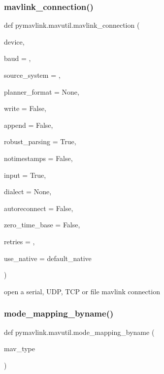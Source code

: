 \subsubsection{\texorpdfstring{mavlink\+\_\+connection()}{mavlink\_connection()}}
{\footnotesize\ttfamily def pymavlink.\+mavutil.\+mavlink\+\_\+connection (\begin{DoxyParamCaption}\item[{}]{device,  }\item[{}]{baud = {},  }\item[{}]{source\+\_\+system = {},  }\item[{}]{planner\+\_\+format = {\ttfamily None},  }\item[{}]{write = {\ttfamily False},  }\item[{}]{append = {\ttfamily False},  }\item[{}]{robust\+\_\+parsing = {\ttfamily True},  }\item[{}]{notimestamps = {\ttfamily False},  }\item[{}]{input = {\ttfamily True},  }\item[{}]{dialect = {\ttfamily None},  }\item[{}]{autoreconnect = {\ttfamily False},  }\item[{}]{zero\+\_\+time\+\_\+base = {\ttfamily False},  }\item[{}]{retries = {},  }\item[{}]{use\+\_\+native = {\ttfamily default\+\_\+native} }\end{DoxyParamCaption})}

\begin{DoxyVerb}open a serial, UDP, TCP or file mavlink connection\end{DoxyVerb}
 \mbox{\label{namespacepymavlink_1_1mavutil_adcc2e66e515b28aa81dd57269146f732}} 
\subsubsection{\texorpdfstring{mode\+\_\+mapping\+\_\+byname()}{mode\_mapping\_byname()}}
{\footnotesize\ttfamily def pymavlink.\+mavutil.\+mode\+\_\+mapping\+\_\+byname (\begin{DoxyParamCaption}\item[{}]{mav\+\_\+type }\end{DoxyParamCaption})}

